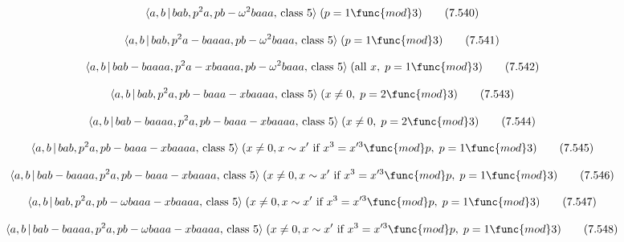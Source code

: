 \documentclass[10pt]{article}
\begin{document}
\begin{equation}
\langle a,b\,|\,bab,p^{2}a,pb-\omega ^{2}baaa,\,\text{class }5\rangle \;(p=1%
\func{mod}3)  \tag{7.540}
\end{equation}

\begin{equation}
\langle a,b\,|\,bab,p^{2}a-baaaa,pb-\omega ^{2}baaa,\,\text{class }5\rangle
\;(p=1\func{mod}3)  \tag{7.541}
\end{equation}

\begin{equation}
\langle a,b\,|\,bab-baaaa,p^{2}a-xbaaaa,pb-\omega ^{2}baaa,\,\text{class }%
5\rangle \;(\text{all }x,\;p=1\func{mod}3)  \tag{7.542}
\end{equation}

\begin{equation}
\langle a,b\,|\,bab,p^2a,pb-baaa-xbaaaa,\,\text{class }5\rangle \;(x \neq
0,\;p=2 \func{mod} 3)  \tag{7.543}
\end{equation}

\begin{equation}
\langle a,b\,|\,bab-baaaa,p^2a,pb-baaa-xbaaaa,\,\text{class }5\rangle \;(x
\neq 0,\;p=2 \func{mod} 3)  \tag{7.544}
\end{equation}

\begin{equation}
\langle a,b\,|\,bab,p^2a,pb-baaa-xbaaaa,\,\text{class }5\rangle \;(x \neq 0,
x \sim x^{\prime }\text{ if }x^3=x^{\prime 3 }\func{mod} p,\;p=1 \func{mod}
3)  \tag{7.545}
\end{equation}

\begin{equation}
\langle a,b\,|\,bab-baaaa,p^2a,pb-baaa-xbaaaa,\,\text{class }5\rangle \;(x
\neq 0, x \sim x^{\prime }\text{ if }x^3=x^{\prime 3 }\func{mod} p,\;p=1 
\func{mod} 3)  \tag{7.546}
\end{equation}

\begin{equation}
\langle a,b\,|\,bab,p^{2}a,pb-\omega baaa-xbaaaa,\,\text{class }5\rangle
\;(x\neq 0,x \sim x^{\prime }\text{ if }x^3=x^{\prime 3}\func{mod}p,\;p=1%
\func{mod}3)  \tag{7.547}
\end{equation}

\begin{equation}
\langle a,b\,|\,bab-baaaa,p^{2}a,pb-\omega baaa-xbaaaa,\,\text{class }%
5\rangle \;(x\neq 0,x \sim x^{\prime }\text{ if }x^3=x^{\prime 3}\func{mod}%
p,\;p=1\func{mod}3)  \tag{7.548}
\end{equation}
\end{document}
